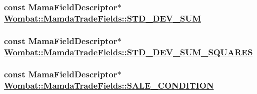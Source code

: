 \hypertarget{classWombat_1_1MamdaTradeFields_ae928651068cc99b18cf81dcd9316c5e}{
\subsubsection[STD\_\-DEV\_\-SUM]{\setlength{\rightskip}{0pt plus 5cm}const Mama\-Field\-Descriptor$\ast$ \hyperlink{classWombat_1_1MamdaTradeFields_ae928651068cc99b18cf81dcd9316c5e}{Wombat::Mamda\-Trade\-Fields::STD\_\-DEV\_\-SUM}}}
\label{classWombat_1_1MamdaTradeFields_ae928651068cc99b18cf81dcd9316c5e}


\hypertarget{classWombat_1_1MamdaTradeFields_c893dd72ef0c314bbac5343dd27a96bb}{
\subsubsection[STD\_\-DEV\_\-SUM\_\-SQUARES]{\setlength{\rightskip}{0pt plus 5cm}const Mama\-Field\-Descriptor$\ast$ \hyperlink{classWombat_1_1MamdaTradeFields_c893dd72ef0c314bbac5343dd27a96bb}{Wombat::Mamda\-Trade\-Fields::STD\_\-DEV\_\-SUM\_\-SQUARES}}}
\label{classWombat_1_1MamdaTradeFields_c893dd72ef0c314bbac5343dd27a96bb}


\hypertarget{classWombat_1_1MamdaTradeFields_a42d2901c067527a5a9f81abaf5c4715}{
\subsubsection[SALE\_\-CONDITION]{\setlength{\rightskip}{0pt plus 5cm}const Mama\-Field\-Descriptor$\ast$ \hyperlink{classWombat_1_1MamdaTradeFields_a42d2901c067527a5a9f81abaf5c4715}{Wombat::Mamda\-Trade\-Fields::SALE\_\-CONDITION}}}
\label{classWombat_1_1MamdaTradeFields_a42d2901c067527a5a9f81abaf5c4715}


